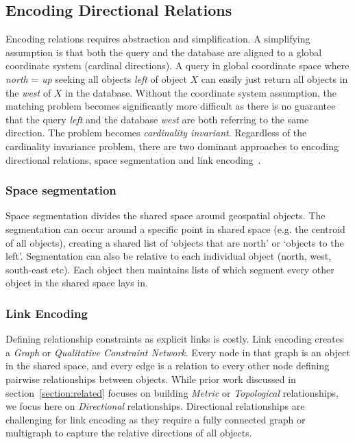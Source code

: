 \subsection{Encoding Directional Relations}
\par{

    Encoding relations requires abstraction and simplification. 
    A simplifying assumption is that both the query and the database are aligned to a global coordinate system (cardinal directions).
    A query in global coordinate space where \textit{north} = \textit{up} seeking all objects \textit{left} of object $X$ can easily just return all objects in the \textit{west} of $X$ in the database.
    Without the coordinate system assumption, the matching problem becomes significantly more difficult as there is no guarantee that the query \textit{left} and the database \textit{west} are both referring to the same direction.
    The problem becomes \textit{cardinality invariant}. 
    Regardless of the cardinality invariance problem, there are two dominant approaches to encoding directional relations, space segmentation and link encoding~\cite{Dellapenna2012,Dellapenna2017}.

    \subsubsection{Space segmentation} 
    Space segmentation divides the shared space around geospatial objects.
    The segmentation can occur around a specific point in shared space (e.g. the centroid of all objects), creating a shared list of `objects that are north' or `objects to the left'. 
    Segmentation can also be relative to each individual object (north, west, south-east etc). 
    Each object then maintains lists of which segment every other object in the shared space lays in.
    
    \subsubsection{Link Encoding} 
    Defining relationship constraints as explicit links is costly. 
    Link encoding creates a \textit{Graph} or \textit{Qualitative Constraint Network}.
    Every node in that graph is an object in the shared space, and every edge is a relation to every other node defining pairwise relationships between objects. 
    While prior work discussed in section~\ref{section:related} focuses on building \textit{Metric} or \textit{Topological} relationships, we focus here on \textit{Directional} relationships.
    Directional relationships are challenging for link encoding as they require a fully connected graph or multigraph to capture the relative directions of all objects.
}



